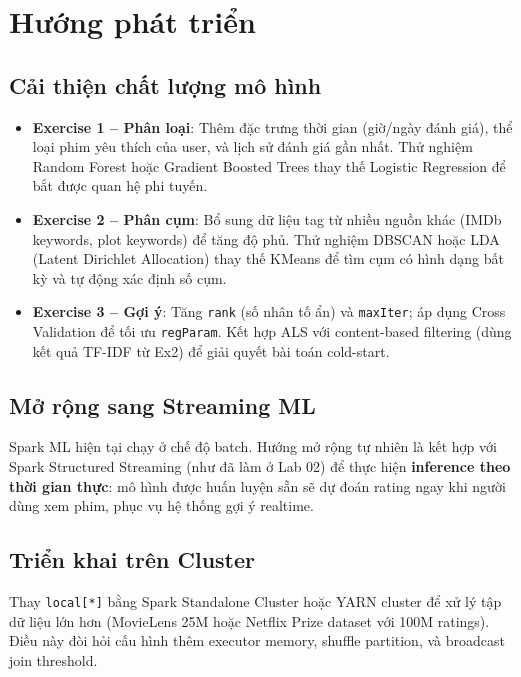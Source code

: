 \section{Hướng phát triển}

\subsection{Cải thiện chất lượng mô hình}

\begin{itemize}
    \item \textbf{Exercise 1 -- Phân loại}: Thêm đặc trưng thời gian (giờ/ngày đánh giá), thể loại phim yêu thích của user, và lịch sử đánh giá gần nhất. Thử nghiệm Random Forest hoặc Gradient Boosted Trees thay thế Logistic Regression để bắt được quan hệ phi tuyến.
    \item \textbf{Exercise 2 -- Phân cụm}: Bổ sung dữ liệu tag từ nhiều nguồn khác (IMDb keywords, plot keywords) để tăng độ phủ. Thử nghiệm DBSCAN hoặc LDA (Latent Dirichlet Allocation) thay thế KMeans để tìm cụm có hình dạng bất kỳ và tự động xác định số cụm.
    \item \textbf{Exercise 3 -- Gợi ý}: Tăng \texttt{rank} (số nhân tố ẩn) và \texttt{maxIter}; áp dụng Cross Validation để tối ưu \texttt{regParam}. Kết hợp ALS với content-based filtering (dùng kết quả TF-IDF từ Ex2) để giải quyết bài toán cold-start.
\end{itemize}

\subsection{Mở rộng sang Streaming ML}

Spark ML hiện tại chạy ở chế độ batch. Hướng mở rộng tự nhiên là kết hợp với Spark Structured Streaming (như đã làm ở Lab 02) để thực hiện \textbf{inference theo thời gian thực}: mô hình được huấn luyện sẵn sẽ dự đoán rating ngay khi người dùng xem phim, phục vụ hệ thống gợi ý realtime.

\subsection{Triển khai trên Cluster}

Thay \texttt{local[*]} bằng Spark Standalone Cluster hoặc YARN cluster để xử lý tập dữ liệu lớn hơn (MovieLens 25M hoặc Netflix Prize dataset với 100M ratings). Điều này đòi hỏi cấu hình thêm executor memory, shuffle partition, và broadcast join threshold.
